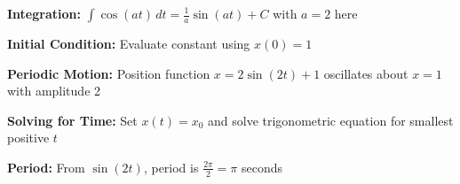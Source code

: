 \begin{takeaways}
\item \textbf{Integration:} $\int \cos(at)\,dt = \frac{1}{a}\sin(at) + C$ with $a = 2$ here
\item \textbf{Initial Condition:} Evaluate constant using $x(0) = 1$
\item \textbf{Periodic Motion:} Position function $x = 2\sin(2t) + 1$ oscillates about $x = 1$ with amplitude 2
\item \textbf{Solving for Time:} Set $x(t) = x_0$ and solve trigonometric equation for smallest positive $t$
\item \textbf{Period:} From $\sin(2t)$, period is $\frac{2\pi}{2} = \pi$ seconds
\end{takeaways}
